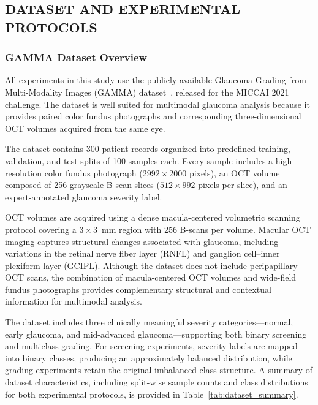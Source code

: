 \documentclass[preprint,12pt]{elsarticle}
\begin{document}
\subsection{DATASET AND EXPERIMENTAL PROTOCOLS}
\label{subsec32}

\subsubsection{GAMMA Dataset Overview}
\label{subsec321}

All experiments in this study use the publicly available Glaucoma Grading from Multi-Modality Images (GAMMA) dataset~\cite{wu2023gamma}, released for the MICCAI 2021 challenge. The dataset is well suited for multimodal glaucoma analysis because it provides paired color fundus photographs and corresponding three-dimensional OCT volumes acquired from the same eye.

The dataset contains 300 patient records organized into predefined training, validation, and test splits of 100 samples each. Every sample includes a high-resolution color fundus photograph ($2992 \times 2000$ pixels), an OCT volume composed of 256 grayscale B-scan slices ($512 \times 992$ pixels per slice), and an expert-annotated glaucoma severity label.

OCT volumes are acquired using a dense macula-centered volumetric scanning protocol covering a $3 \times 3$~mm region with 256 B-scans per volume. Macular OCT imaging captures structural changes associated with glaucoma, including variations in the retinal nerve fiber layer (RNFL) and ganglion cell–inner plexiform layer (GCIPL). Although the dataset does not include peripapillary OCT scans, the combination of macula-centered OCT volumes and wide-field fundus photographs provides complementary structural and contextual information for multimodal analysis.

The dataset includes three clinically meaningful severity categories—normal, early glaucoma, and mid-advanced glaucoma—supporting both binary screening and multiclass grading. For screening experiments, severity labels are mapped into binary classes, producing an approximately balanced distribution, while grading experiments retain the original imbalanced class structure. A summary of dataset characteristics, including split-wise sample counts and class distributions for both experimental protocols, is provided in Table~\ref{tab:dataset_summary}.
\end{document}
